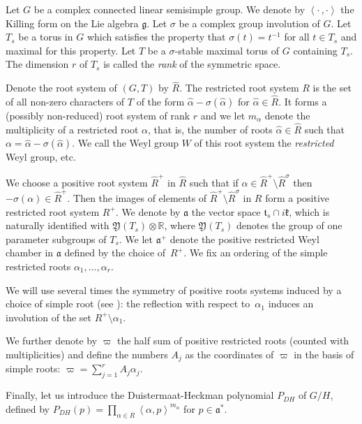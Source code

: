 \documentclass[JEP,XML,SOM,Unicode, NoEqCountersInSection, NoFloatCountersInSection]{cedram}
\theoremstyle{plain}
\theoremstyle{definition}
\newcommand{\fa}{\mathfrak{a}}
\newcommand{\ha}{\hat{\alpha}}
\newcommand{\Roots}{\hat{R}}
\newcommand{\rRoots}{R}
\begin{document}
Let $G$ be a complex connected linear semisimple group.
We denote by $\left<\cdot\,,\cdot\right>$ the Killing form on the Lie algebra
$\mathfrak{g}$.
Let $\sigma$ be a complex group involution of $G$.
Let $T_s$ be a torus in $G$ which satisfies the property that
$\sigma(t)=t^{-1}$ for all $t\in T_s$ and maximal for this property.
Let $T$ be a $\sigma$-stable maximal torus of $G$ containing $T_s$.
The dimension $r$ of $T_s$ is called the \emph{rank} of the symmetric space.

Denote the root system of $(G,T)$ by $\Roots$.
The restricted root system $\rRoots$ is the set of all non-zero characters
of $T$ of the form $\ha-\sigma(\ha)$ for $\ha\in \Roots$.
It forms a (possibly non-reduced) root system of rank $r$ and we let $m_{\alpha}$
denote the multiplicity of a restricted root $\alpha$, that is, the number of
roots $\ha\in \Roots$ such that $\alpha=\ha-\sigma(\ha)$.
We call the Weyl group $W$ of this root system the \emph{restricted} Weyl group, etc.

We choose a positive root system $\Roots^+$ in $\Roots$ such that if
$\alpha\in \Roots^+\setminus \Roots^{\sigma}$
then \hbox{$-\sigma(\alpha)\in \Roots^+$}. Then the images of elements of
$\Roots^+\setminus \Roots^{\sigma}$ in $\rRoots$ form a positive
restricted root system $\rRoots^+$.
We denote by $\fa$ the vector space
$\mathfrak{t}_s\cap i\mathfrak{k}$, which is naturally identified with
$\mathfrak{Y}(T_s)\otimes \mathbb{R}$, where $\mathfrak{Y}(T_s)$ denotes
the group of one parameter subgroups of $T_s$.
We let $\mathfrak{a}^+$ denote the positive restricted Weyl chamber in
$\mathfrak{a}$ defined by the choice of~$\rRoots^+$.
We fix an ordering of the simple restricted roots $\alpha_1,\ldots,\alpha_r$.

We will use several times the symmetry of positive roots systems induced by
a choice of simple root (see \eg \cite[Lem.\,10.2.B]{Hum78}):
the reflection with respect to~$\alpha_1$ induces
an involution of the set $\rRoots^+\setminus \alpha_1$.

We further denote by $\varpi$ the half sum of positive restricted roots
(counted with multiplicities) and define the numbers $A_j$ as
the coordinates of $\varpi$ in the basis of simple roots:
$\varpi = \sum_{j=1}^r A_j\alpha_j$.

Finally, let us introduce the Duistermaat-Heckman polynomial $P_{DH}$ of $G/H$,
defined by
$P_{DH}(p)=\prod_{\alpha\in\rRoots} \left<\alpha,p\right>^{m_{\alpha}}$
for $p\in \mathfrak{a}^*$.
\end{document}
